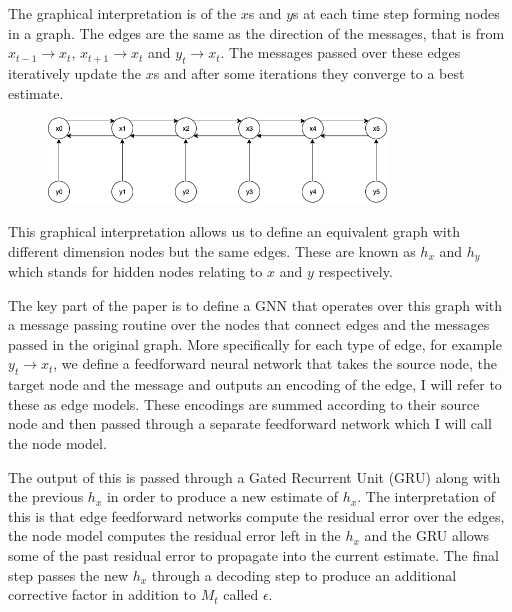 \documentclass[]{../resources/final_report}
\begin{document}
  

The graphical interpretation is of the $x$s and $y$s at each time step forming nodes in a graph. The 
edges are the same as the direction of the messages, that is from $x_{t-1} \rightarrow x_t$, $x_{t+1} \rightarrow x_t$ and $y_t \rightarrow x_t$. 
The messages passed over these edges iteratively update the $x$s and after some iterations they 
converge to a best estimate.


\begin{figure}[h]
  \centering
  \includegraphics[width=0.8\textwidth]{GraphicalKalmanModel.png}  
  \caption{}
  \label{}
\end{figure}




This graphical interpretation allows us to define an equivalent graph with different dimension nodes 
but the same edges. These are known as $h_x$ and $h_y$ which stands for hidden nodes relating to $x$ 
and $y$ respectively. 


The key part of the paper is to define a GNN that operates over this graph with a message passing
routine over the nodes that connect edges and the messages passed in the original 
graph. More specifically for each type of edge, for example $y_t \rightarrow x_t$, we define a 
feedforward neural network that takes the source node, the target node and the message and outputs 
an encoding of the edge, I will refer to these as edge models. These encodings are summed according 
to their source node and then passed through a separate feedforward network which I will call the 
node model. 

The output of this is passed through a Gated Recurrent Unit (GRU) along with the 
previous $h_x$ in order to produce a new estimate of $h_x$. The interpretation of this is that 
edge feedforward networks compute the residual error over the edges, the node model computes the 
residual error left in the $h_x$ and the GRU allows some of the past residual error to propagate 
into the current estimate. The final step passes the new $h_x$ through a decoding step to produce an additional corrective 
factor in addition to $M_t$ called $\epsilon$.
\end{document}
